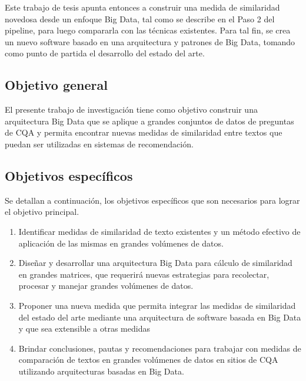 \bigskip Este trabajo de tesis apunta entonces a construir una medida de similaridad novedosa desde un enfoque Big Data, tal como se describe en el Paso 2 del pipeline, para luego compararla con las técnicas existentes. Para tal fin, se crea un nuevo software basado en una arquitectura y patrones de Big Data, tomando como punto de partida el desarrollo del estado del arte.

\subsection{Objetivo general}
El presente trabajo de investigación tiene como objetivo construir una arquitectura Big Data que se aplique a grandes conjuntos de datos de preguntas de CQA y permita encontrar nuevas medidas de similaridad entre textos que puedan ser utilizadas en sistemas de recomendación.

\subsection{Objetivos específicos}
Se detallan a continuación, los objetivos específicos que son necesarios para lograr el objetivo principal.
\begin{enumerate}
	\item Identificar medidas de similaridad de texto existentes y un método efectivo de aplicación de las mismas en grandes volúmenes de datos.
	\item Diseñar y desarrollar una arquitectura Big Data para cálculo de similaridad en grandes matrices, que requerirá nuevas estrategias para recolectar, procesar y manejar grandes volúmenes de datos.
	\item Proponer una nueva medida que permita integrar las medidas de similaridad del estado del arte mediante una arquitectura de software basada en Big Data y que sea extensible a otras medidas
	\item Brindar conclusiones, pautas y recomendaciones para trabajar con medidas de comparación de textos en grandes volúmenes de datos en sitios de CQA utilizando arquitecturas basadas en Big Data.
\end{enumerate}